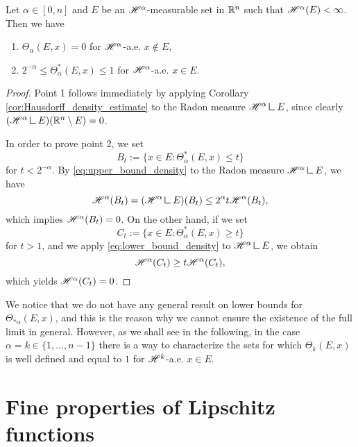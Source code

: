 \begin{proposition}\label{prop:Hausdorff_density_estimate_1}
Let $\alpha \in [0, n]$ and $E$ be an $\mathscr{H}^{\alpha}$-measurable set in $\mathbb{R}^{n}$ such that $\mathscr{H}^{\alpha}(E) < \infty$. Then we have
\begin{enumerate}
\item $\Theta_{\alpha}(E, x) = 0$ for $\mathscr{H}^{\alpha}$-a.e. $x \notin E$,
\item $2^{-\alpha} \le \Theta^{*}_{\alpha}(E, x) \le 1$ for $\mathscr{H}^{\alpha}$-a.e. $x \in E$.
\end{enumerate}
\end{proposition}
\begin{proof}
Point 1 follows immediately by applying Corollary \ref{cor:Hausdorff_density_estimate} to the Radon measure $\Haus{\alpha} \res E$, since clearly $(\Haus{\alpha} \res E)(\R^{n} \setminus E) = 0$.
\smallskip

In order to prove point 2, we set 
\begin{equation*}
B_{t} := \{ x \in E :  \Theta^{*}_{\alpha}(E, x) \le t \}
\end{equation*}
for $t < 2^{- \alpha}$. By \eqref{eq:upper_bound_density} to the Radon measure $\Haus{\alpha} \res E$, we have
\begin{equation*}
\Haus{\alpha}(B_{t}) = (\Haus{\alpha} \res E)(B_t) \le 2^{\alpha} t \Haus{\alpha}(B_{t}),
\end{equation*}
which implies $\mathscr{H}^{\alpha}(B_{t}) = 0$. On the other hand, if we set
\begin{equation*}
C_{t} := \{ x \in E : \Theta^{*}_{\alpha}(E, x) \ge t \}
\end{equation*}
for $t > 1$, and we apply \eqref{eq:lower_bound_density} to $\Haus{\alpha} \res E$, we obtain
\begin{equation*}
\mathscr{H}^{\alpha}(C_{t}) \ge t \mathscr{H}^{\alpha}(C_{t}),
\end{equation*}
which yields $\mathscr{H}^{\alpha}(C_{t}) = 0$.
\end{proof}

We notice that we do not have any general result on lower bounds for $\Theta_{* \alpha}(E, x)$, and this is the reason why we cannot ensure the existence of the full limit in general. However, as we shall see in the following, in the case $\alpha = k \in \{1, \dots, n - 1\}$ there is a way to characterize the sets for which $\Theta_{k}(E, x)$ is well defined and equal to $1$ for $\mathscr{H}^{k}$-a.e. $x \in E$.

\section{Fine properties of Lipschitz functions}

